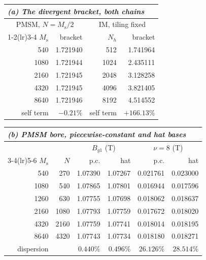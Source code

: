 \documentclass[10pt,a4paper,twocolumn]{article}
\theoremstyle{plain}
\theoremstyle{remark}
\begin{document}
\begin{table}[!ht]
\centering
\begin{threeparttable}
\footnotesize
\begin{tabular}{rrrr}
\multicolumn{4}{l}{\emph{(a) The divergent bracket, both chains}}\\
\toprule
\multicolumn{2}{c}{PMSM, $N=M_{\mathrm{s}}/2$}
& \multicolumn{2}{c}{IM, tiling fixed}\\
\cmidrule(lr){1-2}\cmidrule(lr){3-4}
$M_{\mathrm{s}}$ & bracket & $N_h$ & bracket \\
\midrule
\num{540}  & \num{1.721940} & \num{512}  & \num{1.741964}\\
\num{1080} & \num{1.721944} & \num{1024} & \num{2.435111}\\
\num{2160} & \num{1.721945} & \num{2048} & \num{3.128258}\\
\num{4320} & \num{1.721945} & \num{4096} & \num{3.821405}\\
\num{8640} & \num{1.721946} & \num{8192} & \num{4.514552}\\
\midrule
self term & $-0.21\%$ & self term & $+166.13\%$\\
\bottomrule
\end{tabular}

\vspace{3mm}

\begin{tabular}{rrrrrr}
\multicolumn{6}{l}{\emph{(b) PMSM bore, piecewise-constant and hat bases}}\\
\toprule
& & \multicolumn{2}{c}{$B_{g1}$ (\si{\tesla})}
    & \multicolumn{2}{c}{$\nu=8$ (\si{\tesla})}\\
\cmidrule(lr){3-4}\cmidrule(lr){5-6}
$M_{\mathrm{s}}$ & $N$ & p.c. & hat & p.c. & hat \\
\midrule
\num{540}  & \num{270}  & \num{1.07390} & \num{1.07267} & \num{0.021761} & \num{0.023000}\\
\num{1080} & \num{540}  & \num{1.07865} & \num{1.07801} & \num{0.016944} & \num{0.017596}\\
\num{1260} & \num{630}  & \num{1.07755} & \num{1.07698} & \num{0.018062} & \num{0.018637}\\
\num{2160} & \num{1080} & \num{1.07793} & \num{1.07759} & \num{0.017672} & \num{0.018020}\\
\num{4320} & \num{2160} & \num{1.07759} & \num{1.07741} & \num{0.018014} & \num{0.018195}\\
\num{8640} & \num{4320} & \num{1.07743} & \num{1.07734} & \num{0.018180} & \num{0.018271}\\
\midrule
dispersion & & $0.440\%$ & $0.496\%$ & $26.126\%$ & $28.514\%$\\
\bottomrule
\end{tabular}


\end{threeparttable}
\end{table}
\end{document}
